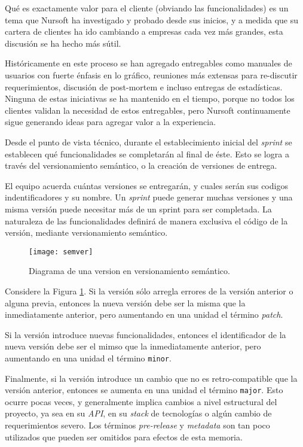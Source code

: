 Qué es exactamente valor para el cliente (obviando las funcionalidades) es un tema que Nursoft ha investigado y probado
desde sus inicios, y a medida que su cartera de clientes ha ido cambiando a empresas cada vez más grandes, esta discusión
se ha hecho más sútil. 

Históricamente en este proceso se han agregado entregables como manuales de usuarios con fuerte énfasis en lo gráfico,
reuniones más extensas para re-discutir requerimientos, discusión de post-mortem e incluso entregas de estadísticas. 
Ninguna de estas iniciativas se ha mantenido en el tiempo, porque no todos los clientes validan la necesidad de estos
entregables, pero Nursoft continuamente sigue generando ideas para agregar valor a la experiencia.


Desde el punto de vista técnico, durante el establecimiento inicial del \textit{sprint} se establecen qué funcionalidades
se completarán al final de éste. Esto se logra a través del versionamiento semántico, o la creación de versiones de entrega.

El equipo acuerda cuántas versiones se entregarán, y cuales serán sus codigos indentificadores y su nombre. Un \textit{sprint}
puede generar muchas versiones y una misma versión puede necesitar más de un sprint para ser completada. La naturaleza de 
las funcionalidades definirá de manera exclusiva el código de la versión, mediante versionamiento semántico.


\begin{figure}[h]
  \centering
  \texttt{[image: semver]}
  \caption{Diagrama de una version en versionamiento semántico.}
  \label{fig:semver}
\end{figure}

Considere la Figura \ref{fig:semver}. Si la versión sólo arregla errores de la versión anterior o alguna previa, entonces
la nueva versión debe ser la misma que la inmediatamente anterior, pero aumentando en una unidad el término \textit{patch}.

Si la versión introduce nuevas funcionalidades, entonces el identificador de la nueva versión debe ser el mimso que la
inmediatamente anterior, pero aumentando en una unidad el término \texttt{minor}.

Finalmente, si la versión introduce un cambio que no es retro-compatible que la versión anterior, entonces se aumenta en una
unidad el término \texttt{major}. Esto ocurre pocas veces, y generalmente implica cambios a nivel estructural del proyecto,
ya sea en su \textit{API}, en su \textit{stack} de tecnologías o algún cambio de requerimientos severo.
Los términos \textit{pre-release} y \textit{metadata} son tan poco utilizados que pueden ser omitidos para efectos de esta memoria.

